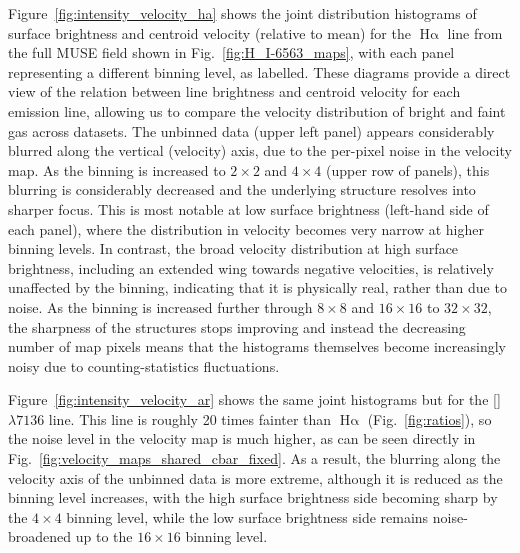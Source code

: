 \documentclass[fleqn,usenatbib, useAMS, a4paper]{mnras}
\newcommand\ha{\ensuremath{\text{H}\upalpha}}
\newcommand\Wav[1]{\ensuremath{\lambda #1}}
\newcommand\ariii{[\ion{Ar}{III}] \Wav{7136}}
\newcommand\halpha{\ha}
\begin{document}
Figure~\ref{fig:intensity_velocity_ha} shows the joint distribution histograms of surface brightness and centroid velocity (relative to mean)
for the \halpha{} line from the full MUSE field shown in Fig.~\ref{fig:H_I-6563_maps},
with each panel representing a different binning level, as labelled.
These diagrams provide a direct view of the relation between line brightness and centroid velocity for each emission line, allowing us to compare the velocity distribution of bright and faint gas across datasets.
The unbinned data (upper left panel) appears considerably blurred along the vertical (velocity) axis,
due to the per-pixel noise in the velocity map.
As the binning is increased to \(2\times 2\) and \(4 \times 4\) (upper row of panels),
this blurring is considerably decreased and the underlying structure resolves into sharper focus.
This is most notable at low surface brightness (left-hand side of each panel),
where the distribution in velocity becomes very narrow at higher binning levels.
In contrast, the broad velocity distribution at high surface brightness,
including an extended wing towards negative velocities, is relatively unaffected by the binning,
indicating that it is physically real, rather than due to noise.
As the binning is increased further through \(8 \times 8\) and \(16 \times 16\) to \(32 \times 32\),
the sharpness of the structures stops improving and instead the decreasing number of map pixels
means that the histograms themselves become increasingly noisy due to counting-statistics fluctuations.

Figure~\ref{fig:intensity_velocity_ar} shows the same joint histograms but for the \ariii{} line.
This line is roughly 20 times fainter than \halpha{} (Fig.~\ref{fig:ratios}),
so the noise level in the velocity map is much higher, as can be seen directly in Fig.~\ref{fig:velocity_maps_shared_cbar_fixed}.
As a result, the blurring along the velocity axis of the unbinned data is more extreme,
although it is reduced as the binning level increases,
with the high surface brightness side becoming sharp by the \(4 \times 4\) binning level,
while the low surface brightness side remains noise-broadened up to the \(16 \times 16\) binning level.
\end{document}
